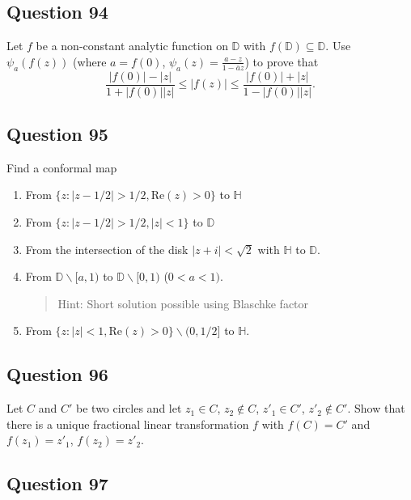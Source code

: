 \documentclass[12pt]{article}
\begin{document}
\hypertarget{question-94-1}{%
\subsection{Question 94}\label{question-94-1}}

Let \(f\) be a non-constant analytic function on \(\mathbb D\) with
\(f(\mathbb D) \subseteq \mathbb D\). Use \(\psi_{a} (f(z))\) (where
\(a=f(0)\), \(\displaystyle \psi_a(z) = \frac{a - z}{1 - \bar{a}z}\)) to
prove that \[\displaystyle
\frac{|f(0)| - |z|}{1 + |f(0)||z|} \leq |f(z)| \leq
\frac{|f(0)| + |z|}{1 - |f(0)||z|}.\]

\hypertarget{question-95-1}{%
\subsection{Question 95}\label{question-95-1}}

Find a conformal map

\begin{enumerate}
\def\labelenumi{\arabic{enumi}.}
\item
  From \(\{ z: |z - 1/2| > 1/2, \text{Re}(z)>0 \}\) to \(\mathbb H\)
\item
  From \(\{ z: |z - 1/2| > 1/2, |z| <1 \}\) to \(\mathbb D\)
\item
  From the intersection of the disk \(|z + i| < \sqrt{2}\) with
  \({\mathbb H}\) to \({\mathbb D}\).
\item
  From \({\mathbb D} \backslash [a, 1)\) to
  \({\mathbb D} \backslash [0, 1)\) (\(0<a<1)\).

  \begin{quote}
  Hint: Short solution possible using Blaschke factor
  \end{quote}
\item
  From \(\{ z: |z| < 1, \text{Re}(z) > 0 \} \backslash (0, 1/2]\) to
  \(\mathbb H\).
\end{enumerate}

\hypertarget{question-96-1}{%
\subsection{Question 96}\label{question-96-1}}

Let \(C\) and \(C'\) be two circles and let \(z_1 \in C\),
\(z_2 \notin C\), \(z'_1 \in C'\), \(z'_2 \notin C'\). Show that there
is a unique fractional linear transformation \(f\) with \(f(C) = C'\)
and \(f(z_1) = z'_1\), \(f(z_2) = z'_2\).

\hypertarget{question-97-1}{%
\subsection{Question 97}\label{question-97-1}}
\end{document}
